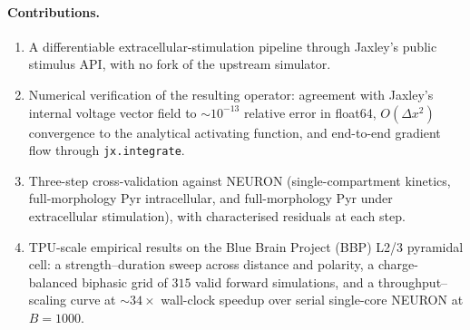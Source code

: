 \paragraph{Contributions.}
\begin{enumerate}
  \item A differentiable extracellular-stimulation pipeline through
  Jaxley's public stimulus API, with no fork of the upstream simulator.
  \item Numerical verification of the resulting operator: agreement
  with Jaxley's internal voltage vector field to $\sim\!10^{-13}$
  relative error in float64, $O(\Delta x^2)$ convergence to the
  analytical activating function, and end-to-end gradient flow through
  \texttt{jx.integrate}.
  \item Three-step cross-validation against NEURON (single-compartment
  kinetics, full-morphology Pyr intracellular, and full-morphology Pyr
  under extracellular stimulation), with characterised residuals at
  each step.
  \item TPU-scale empirical results on the Blue Brain Project (BBP)
  L2/3 pyramidal cell: a strength--duration sweep across distance and
  polarity, a charge-balanced biphasic grid of $315$ valid forward
  simulations, and a throughput--scaling curve at $\sim\!34\times$
  wall-clock speedup over serial single-core NEURON at $B = 1000$.
\end{enumerate}
